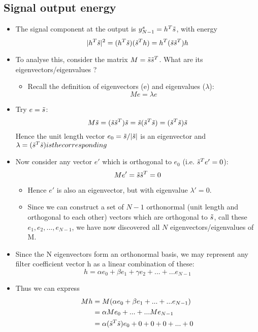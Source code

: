 \documentclass[12pt]{article}
\begin{document}
\subsection{Signal output energy}
\begin{itemize}
    \item The signal component at the output is $y^s_{N-1} = h^T \Tilde{s}$, with energy 
    \[
    |h^T \Tilde{s}|^2 = (h^T \Tilde{s})(\Tilde{s}^T h) = h^T (\Tilde{s} \Tilde{s}^T)h
    \]
    \item To analyse this, consider the matrix $M = \Tilde{s}\Tilde{s}^T$. What are its eigenvectors/eigenvalues ?
    \begin{itemize}
    \item Recall the definition of eigenvectors (e) and eigenvalues ($\lambda$):
    \[
    Me = \lambda e
    \]
    \end{itemize}
    \item Try $e = \Tilde{s}$:
    \[
    M\Tilde{s} = (\Tilde{s}\Tilde{s}^T)\Tilde{s} = \Tilde{s}(\Tilde{s}^T\Tilde{s}) = (\Tilde{s}^T\Tilde{s})\Tilde{s}
    \]
    Hence the unit length vector $e_0 = \Tilde{s}/|\Tilde{s}|$ is an eigenvector and $\lambda = (\Tilde{s}^T\Tilde{s}) is the corresponding$
    \item Now consider any vector $e'$ which is orthogonal to $e_0$ (i.e. $\Tilde{s}^T e' =0$):
    \[
    Me' = \Tilde{s}\Tilde{s}^T = 0
    \]
    \begin{itemize}
    \item Hence $e'$ is also an eigenvector, but with eigenvalue $\lambda' = 0$. 
    \item Since we can construct a set of $N-1$ orthonormal (unit length and orthogonal to each other) vectors which are orthogonal to $\Tilde{s}$, call these $e_1,e_2,...,e_{N-1}$, we have now discovered all $N$ eigenvectors/eigenvalues of M.
    \end{itemize}
    \item Since the N eigenvectors form an orthonormal basis, we may represent any filter coefficient vector h as a linear combination of these:
    \[
    h = \alpha e_0 + \beta e_1 +\gamma e_2 + ... + ...e_{N-1}
    \]
    \item Thus we can express
    \begin{align*}
        Mh &= M(\alpha e_0 + \beta e_1 +... +...e_{N-1}) \\
        &= \alpha Me_0 + ... + ...Me_{N-1} \\
        &= \alpha(\Tilde{s}^T \Tilde{s})e_0 + 0 +0 + 0 +... + 0 \\

\end{align*}
\end{itemize}
\end{document}
